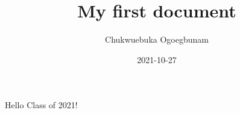 \documentclass{article}
\title{My first document}
\date{2021-10-27}
\author{Chukwuebuka Ogoegbunam}
\begin{document}
	\maketitle
	\newpage
	Hello Class of 2021!
\end{document}
